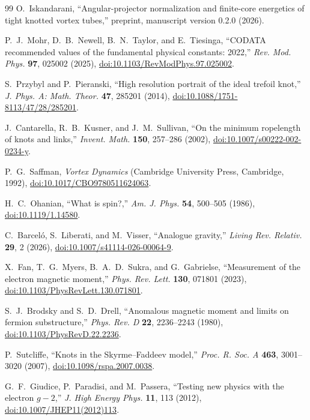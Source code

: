 \documentclass[aps,pre,preprint,notitlepage,nofootinbib,superscriptaddress]{revtex4-2}
\begin{document}
\begin{thebibliography}{99}
O.~Iskandarani,
``Angular-projector normalization and finite-core energetics of tight knotted vortex tubes,''
preprint, manuscript version 0.2.0 (2026).

P.~J.~Mohr, D.~B.~Newell, B.~N.~Taylor, and E.~Tiesinga,
``CODATA recommended values of the fundamental physical constants: 2022,''
\emph{Rev. Mod. Phys.} \textbf{97}, 025002 (2025),
\href{https://doi.org/10.1103/RevModPhys.97.025002}{doi:10.1103/RevModPhys.97.025002}.

S.~Przybyl and P.~Pieranski,
``High resolution portrait of the ideal trefoil knot,''
\emph{J. Phys. A: Math. Theor.} \textbf{47}, 285201 (2014),
\href{https://doi.org/10.1088/1751-8113/47/28/285201}{doi:10.1088/1751-8113/47/28/285201}.

J.~Cantarella, R.~B.~Kusner, and J.~M.~Sullivan,
``On the minimum ropelength of knots and links,''
\emph{Invent. Math.} \textbf{150}, 257--286 (2002),
\href{https://doi.org/10.1007/s00222-002-0234-y}{doi:10.1007/s00222-002-0234-y}.

P.~G.~Saffman,
\emph{Vortex Dynamics}
(Cambridge University Press, Cambridge, 1992),
\href{https://doi.org/10.1017/CBO9780511624063}{doi:10.1017/CBO9780511624063}.

H.~C.~Ohanian,
``What is spin?,''
\emph{Am. J. Phys.} \textbf{54}, 500--505 (1986),
\href{https://doi.org/10.1119/1.14580}{doi:10.1119/1.14580}.

C.~Barcel\'o, S.~Liberati, and M.~Visser,
``Analogue gravity,''
\emph{Living Rev. Relativ.} \textbf{29}, 2 (2026),
\href{https://doi.org/10.1007/s41114-026-00064-9}{doi:10.1007/s41114-026-00064-9}.

X.~Fan, T.~G.~Myers, B.~A.~D.~Sukra, and G.~Gabrielse,
``Measurement of the electron magnetic moment,''
\emph{Phys. Rev. Lett.} \textbf{130}, 071801 (2023),
\href{https://doi.org/10.1103/PhysRevLett.130.071801}{doi:10.1103/PhysRevLett.130.071801}.

S.~J.~Brodsky and S.~D.~Drell,
``Anomalous magnetic moment and limits on fermion substructure,''
\emph{Phys. Rev. D} \textbf{22}, 2236--2243 (1980),
\href{https://doi.org/10.1103/PhysRevD.22.2236}{doi:10.1103/PhysRevD.22.2236}.

P.~Sutcliffe,
``Knots in the Skyrme--Faddeev model,''
\emph{Proc. R. Soc. A} \textbf{463}, 3001--3020 (2007),
\href{https://doi.org/10.1098/rspa.2007.0038}{doi:10.1098/rspa.2007.0038}.


G.~F.~Giudice, P.~Paradisi, and M.~Passera,
``Testing new physics with the electron \(g-2\),''
\emph{J. High Energy Phys.} \textbf{11}, 113 (2012),
\href{https://doi.org/10.1007/JHEP11(2012)113}{doi:10.1007/JHEP11(2012)113}.

\end{thebibliography}
\end{document}
